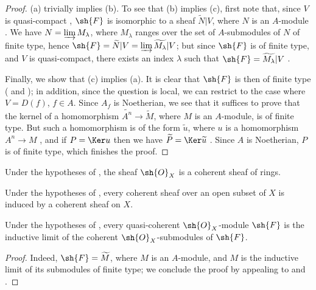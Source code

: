 \begin{proof}
(a) trivially implies (b).
To see that (b) implies (c), first note that, since $V$ is quasi-compact , $\sh{F}$ is isomorphic to a sheaf $\widetilde{N}|V$, where $N$ is an $A$-module .
We have $N=\varinjlim M_\lambda$, where $M_\lambda$ ranges over the set of $A$-submodules of $N$ of finite type, hence  $\sh{F}=\widetilde{N}|V=\varinjlim\widetilde{M_\lambda}|V$;
but since $\sh{F}$ is of finite type, and $V$ is quasi-compact, there exists an index $\lambda$ such that $\sh{F}=\widetilde{M_\lambda}|V$ .

Finally, we show that (c) implies (a).
It is clear that $\sh{F}$ is then of finite type ( and );
in addition, since the question is local, we can restrict to the case where $V=D(f)$, $f\in A$.
Since $A_f$ is Noetherian, we see that it suffices to prove that the kernel of a homomorphism $\widetilde{A^n}\to\widetilde{M}$, where $M$ is an $A$-module, is of finite type.
But such a homomorphism is of the form $\widetilde{u}$, where $u$ is a homomorphism $A^n\to M$ , and if $P=\Ker u$ then we have $\widetilde{P}=\Ker\widetilde{u}$ .
Since $A$ is Noetherian, $P$ is of finite type, which finishes the proof.
\end{proof}

\begin{corollary}[1.5.2]
\label{I.1.5.2}
Under the hypotheses of , the sheaf $\sh{O}_X$ is a coherent sheaf of rings.
\end{corollary}

\begin{corollary}[1.5.3]
\label{I.1.5.3}
Under the hypotheses of , every coherent sheaf over an open subset of $X$ is induced by a coherent sheaf on $X$.
\end{corollary}

\begin{corollary}[1.5.4]
\label{I.1.5.4}
Under the hypotheses of , every quasi-coherent $\sh{O}_X$-module $\sh{F}$ is the inductive limit of the coherent $\sh{O}_X$-submodules of $\sh{F}$.
\end{corollary}

\begin{proof}
Indeed, $\sh{F}=\widetilde{M}$, where $M$ is an $A$-module, and $M$ is the inductive limit of its submodules of finite type;
we conclude the proof by appealing to  and .
\end{proof}

